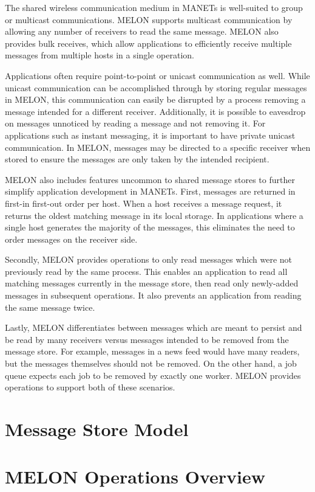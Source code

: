 The shared wireless communication medium in MANETs is well-suited to group or multicast communications. MELON supports multicast communication by allowing any number of receivers to read the same message. MELON also provides bulk receives, which allow applications to efficiently receive multiple messages from multiple hosts in a single operation.

Applications often require point-to-point or unicast communication as well. While unicast communication can be accomplished through by storing regular messages in MELON, this communication can easily be disrupted by a process removing a message intended for a different receiver. Additionally, it is possible to eavesdrop on messages unnoticed by reading a message and not removing it. For applications such as instant messaging, it is important to have private unicast communication. In MELON, messages may be directed to a specific receiver when stored to ensure the messages are only taken by the intended recipient.

MELON also includes features uncommon to shared message stores to further simplify application development in MANETs. First, messages are returned in first-in first-out order per host. When a host receives a message request, it returns the oldest matching message in its local storage. In applications where a single host generates the majority of the messages, this eliminates the need to order messages on the receiver side.

Secondly, MELON provides operations to only read messages which were not previously read by the same process. This enables an application to read all matching messages currently in the message store, then read only newly-added messages in subsequent operations. It also prevents an application from reading the same message twice.

Lastly, MELON differentiates between messages which are meant to persist and be read by many receivers versus messages intended to be removed from the message store. For example, messages in a news feed would have many readers, but the messages themselves should not be removed. On the other hand, a job queue expects each job to be removed by exactly one worker. MELON provides operations to support both of these scenarios.

\section{Message Store Model}

\section{MELON Operations Overview}

